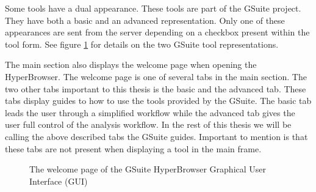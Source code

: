 \documentclass[english]{ifimaster}
\begin{document}
Some tools have a dual appearance. These tools are part of the GSuite project. They have both a basic and an advanced representation. Only one of these appearances are sent from the server depending on a checkbox present within the tool form. See figure \ref{fig:gSuiteBacicAdvanced} for details on the two GSuite tool representations. 


The main section also displays the welcome page when opening the HyperBrowser. The welcome page is one of several tabs in the main section. The two other tabs important to this thesis is the basic and the advanced tab. These tabs display guides to how to use the tools provided by the GSuite. The basic tab leads the user through a simplified workflow while the advanced tab gives the user full control of the analysis workflow. In the rest of this thesis we will be calling the above described tabs the GSuite guides. Important to mention is that these tabs are not present when displaying a tool in the main frame.

\begin{figure}
\centering
{}
\caption{The welcome page of the GSuite HyperBrowser Graphical User Interface (GUI)}
\label{fig:gSuiteBacicAdvanced}
\end{figure}
\end{document}
